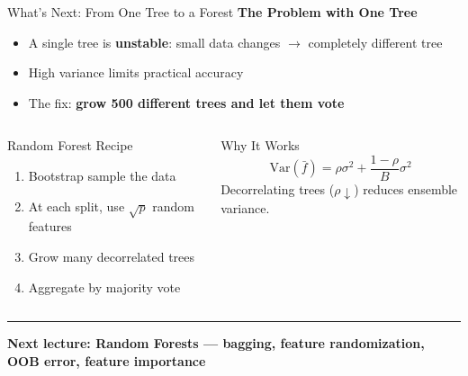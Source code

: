 \documentclass[8pt,aspectratio=169]{beamer}
\newcommand{\bottomnote}[1]{%
\vfill
\vspace{-2mm}
\textcolor{mllavender2}{\rule{\textwidth}{0.4pt}}
\vspace{1mm}
\footnotesize
\textbf{#1}
}
\newenvironment{compactlist}{%
  \begin{itemize}%
    \setlength{\itemsep}{2pt}%
    \setlength{\parskip}{0pt}%
    \setlength{\parsep}{0pt}%
}{%
  \end{itemize}%
}
\newcommand{\highlight}[1]{\textcolor{mlorange}{\textbf{#1}}}
\begin{document}
\begin{frame}[t]{What's Next: From One Tree to a Forest}
\small
\textbf{The Problem with One Tree}

\footnotesize
\begin{compactlist}
\item \footnotesize A single tree is \highlight{unstable}: small data changes $\to$ completely different tree
\item \footnotesize High variance limits practical accuracy
\item \footnotesize The fix: \textbf{grow 500 different trees and let them vote}
\end{compactlist}

\vspace{3mm}
\begin{columns}[T]
\begin{block}{Random Forest Recipe}
\footnotesize
\begin{enumerate}
\item Bootstrap sample the data
\item At each split, use $\sqrt{p}$ random features
\item Grow many decorrelated trees
\item Aggregate by majority vote
\end{enumerate}
\end{block}

\begin{block}{Why It Works}
\footnotesize
\[
\text{Var}(\bar{f}) = \rho\sigma^2 + \frac{1-\rho}{B}\sigma^2
\]
Decorrelating trees ($\rho \downarrow$) reduces ensemble variance.
\end{block}
\end{columns}
\bottomnote{Next lecture: Random Forests --- bagging, feature randomization, OOB error, feature importance}
\end{frame}
\end{document}
